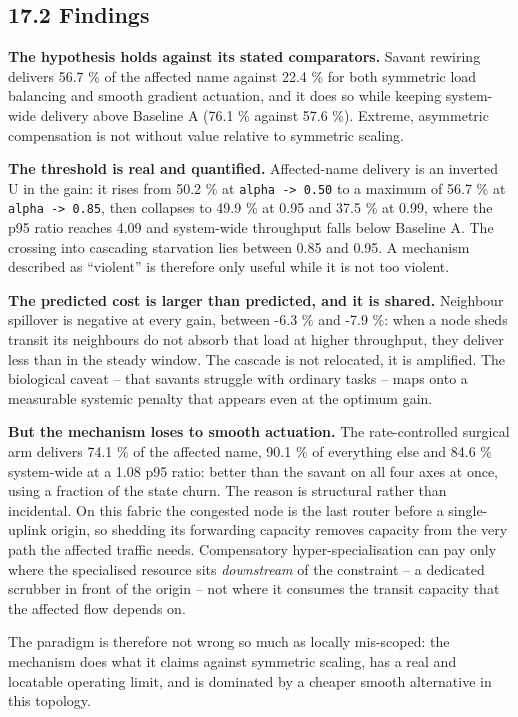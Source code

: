 \documentclass[
  american,
  11pt,
]{article}
\begin{document}
\subsection{17.2 Findings}\label{findings}

\textbf{The hypothesis holds against its stated comparators.} Savant
rewiring delivers 56.7 \% of the affected name against 22.4 \% for both
symmetric load balancing and smooth gradient actuation, and it does so
while keeping system-wide delivery above Baseline A (76.1 \% against
57.6 \%). Extreme, asymmetric compensation is not without value relative
to symmetric scaling.

\textbf{The threshold is real and quantified.} Affected-name delivery is
an inverted U in the gain: it rises from 50.2 \% at
\texttt{alpha\ -\textgreater{}\ 0.50} to a maximum of 56.7 \% at
\texttt{alpha\ -\textgreater{}\ 0.85}, then collapses to 49.9 \% at 0.95
and 37.5 \% at 0.99, where the p95 ratio reaches 4.09 and system-wide
throughput falls below Baseline A. The crossing into cascading
starvation lies between 0.85 and 0.95. A mechanism described as
``violent'' is therefore only useful while it is not too violent.

\textbf{The predicted cost is larger than predicted, and it is shared.}
Neighbour spillover is negative at every gain, between -6.3 \% and -7.9
\%: when a node sheds transit its neighbours do not absorb that load at
higher throughput, they deliver less than in the steady window. The
cascade is not relocated, it is amplified. The biological caveat -- that
savants struggle with ordinary tasks -- maps onto a measurable systemic
penalty that appears even at the optimum gain.

\textbf{But the mechanism loses to smooth actuation.} The
rate-controlled surgical arm delivers 74.1 \% of the affected name, 90.1
\% of everything else and 84.6 \% system-wide at a 1.08 p95 ratio:
better than the savant on all four axes at once, using a fraction of the
state churn. The reason is structural rather than incidental. On this
fabric the congested node is the last router before a single-uplink
origin, so shedding its forwarding capacity removes capacity from the
very path the affected traffic needs. Compensatory hyper-specialisation
can pay only where the specialised resource sits \emph{downstream} of
the constraint -- a dedicated scrubber in front of the origin -- not
where it consumes the transit capacity that the affected flow depends
on.

The paradigm is therefore not wrong so much as locally mis-scoped: the
mechanism does what it claims against symmetric scaling, has a real and
locatable operating limit, and is dominated by a cheaper smooth
alternative in this topology.
\end{document}
